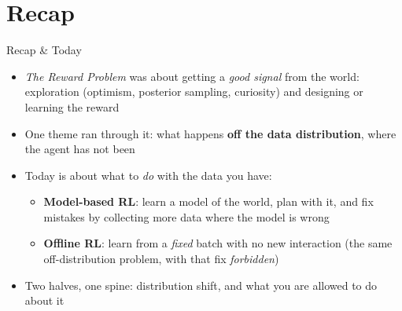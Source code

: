 \section{Recap}
\begin{frame}{Recap \& Today}
\begin{itemize}
    \item \emph{The Reward Problem} was about getting a \emph{good signal}
          from the world: exploration (optimism, posterior sampling, curiosity)
          and designing or learning the reward
    \item One theme ran through it: what happens \textbf{off the data
          distribution}, where the agent has not been
    \item Today is about what to \emph{do} with the data you have:
    \begin{itemize}
        \item \textbf{Model-based RL}: learn a model of the world, plan with it,
              and fix mistakes by collecting more data where the model is wrong
        \item \textbf{Offline RL}: learn from a \emph{fixed} batch with no new
              interaction (the same off-distribution problem, with that fix
              \emph{forbidden})
    \end{itemize}
    \item Two halves, one spine: distribution shift, and what you are allowed to
          do about it
\end{itemize}
\end{frame}

